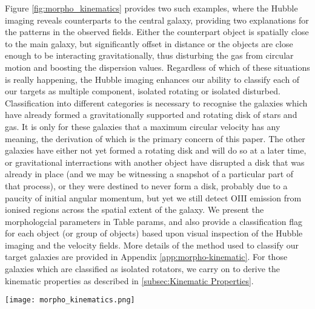 \documentclass[a4paper,fleqn,usenatbib]{mn2e}
\begin{document}
Figure \ref{fig:morpho_kinematics} provides two such examples, where the Hubble imaging reveals counterparts to the central galaxy, providing two explanations for the patterns in the observed fields. 
Either the counterpart object is spatially close to the main galaxy, but significantly offset in distance or the objects are close enough to be interacting gravitationally, thus disturbing the gas from circular motion and boosting the dispersion values. 
Regardless of which of these situations is really happening, the Hubble imaging enhances our ability to classify each of our targets as multiple component, isolated rotating or isolated disturbed.
Classification into different categories is necessary to recognise the galaxies which have already formed a gravitationally supported and rotating disk of stars and gas.
It is only for these galaxies that a maximum circular velocity has any meaning, the derivation of which is the primary concern of this paper.
The other galaxies have either not yet formed a rotating disk and will do so at a later time, or gravitational interractions with another object have disrupted a disk that was already in place (and we may be witnessing a snapshot of a particular part of that process), or they were destined to never form a disk, probably due to a paucity of initial angular momentum, but yet we still detect OIII emission from ionised regions across the spatial extent of the galaxy.   
We present the morphologcial parameters in Table params, and also provide a classification flag for each object (or group of objects) based upon visual inspection of the Hubble imaging and the velocity fields.
More details of the method used to classify our target galaxies are provided in Appendix \ref{app:morpho-kinematic}.
For those galaxies which are classified as isolated rotators, we carry on to derive the kinematic properties as described in \cref{subsec:Kinematic Properties}.


\begin{figure*}
\centering
\texttt{[image: morpho\_kinematics.png]}
\caption{High resolution imaging is important not only for reliably recovering the morphological parameters, but also to explain peculiar features in the observed velocity and velocity dispersion fields.
In the two examples above, multiple components in the HST imaging clearly correspond to marginally different OIII emission wavelengths, which manifest as velocity shifts in individual spaxels and broadens the observed dispersion pattern where the emission lines at different wavelengths merge.}
\label{fig:morpho_kinematics}
\end{figure*}
\end{document}
